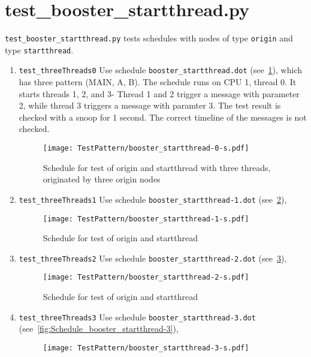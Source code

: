 \documentclass[12pt,a4paper]{report}
\begin{document}
\section{test\_booster\_startthread.py}
\texttt{test\_booster\_startthread.py} tests schedules with nodes of
type \texttt{origin} and type \texttt{startthread}.
\begin{enumerate}
\item \texttt{test\_threeThreads0}
Use schedule \texttt{booster\_startthread.dot} (see~\ref{fig:Schedule_booster_startthread-0}),
which has three pattern (MAIN, A, B). The schedule runs on CPU 1, thread 0.
It starts threads 1, 2, and 3- Thread 1 and 2 trigger a message with parameter 2,
while thread 3 triggers a message with paramter 3. The test result is
checked with a snoop for 1 second. The correct timeline of the messages
is not checked.
    \begin{figure}
        \centering
        \texttt{[image: TestPattern/booster\_startthread-0-s.pdf]}
        \caption{Schedule for test of origin and startthread with three
        threads, originated by three origin nodes}
        \label{fig:Schedule_booster_startthread-0}
    \end{figure}
\item \texttt{test\_threeThreads1}
Use schedule \texttt{booster\_startthread-1.dot} (see~\ref{fig:Schedule_booster_startthread-1}),
    \begin{figure}
        \centering
        \texttt{[image: TestPattern/booster\_startthread-1-s.pdf]}
        \caption{Schedule for test of origin and startthread}
        \label{fig:Schedule_booster_startthread-1}
    \end{figure}
\item \texttt{test\_threeThreads2}
Use schedule \texttt{booster\_startthread-2.dot} (see~\ref{fig:Schedule_booster_startthread-2}),
    \begin{figure}
        \centering
        \texttt{[image: TestPattern/booster\_startthread-2-s.pdf]}
        \caption{Schedule for test of origin and startthread}
        \label{fig:Schedule_booster_startthread-2}
    \end{figure}
\item \texttt{test\_threeThreads3}
Use schedule \texttt{booster\_startthread-3.dot} (see~\ref{fig:Schedule_booster_startthread-3}),
    \begin{figure}
        \centering
        \texttt{[image: TestPattern/booster\_startthread-3-s.pdf]}

\end{figure}
\end{enumerate}
\end{document}
